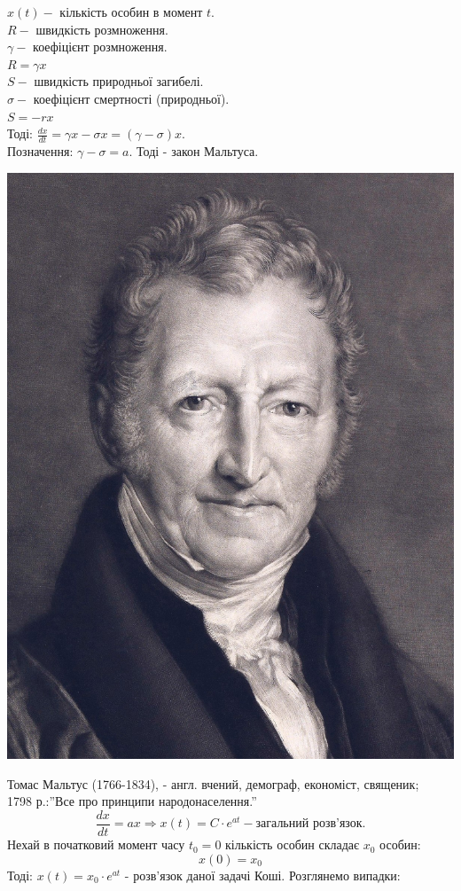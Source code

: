 $x(t) - $ кількість особин в момент $t$.\\
$R - $ швидкість розмноження. \\
$\gamma - $ коефіцієнт розмноження. \\
$ R = \gamma x $\\
$ S - $ швидкість природньої загибелі.\\
$\sigma - $ коефіцієнт смертності (природньої).\\
$S = - rx$\\
Тоді: $ \frac{dx}{dt} = \gamma x - \sigma x = (\gamma - \sigma)x $.\\
Позначення: $ \gamma - \sigma = a$. Тоді  - закон Мальтуса.
\begin{center} \includegraphics[scale=0.1]{assets/lectures_recent-44a47cac.png} \end{center}

Томас Мальтус (1766-1834), - англ. вчений, демограф, економіст, священик;\\
1798 р.:''Все про принципи народонаселення.''
$$
\frac{dx}{dt} = ax \Longrightarrow x(t) = C \cdot e^{at} - \text{загальний розв'язок.}
$$
Нехай в початковий момент часу $t_0 = 0$ кількість особин складає $x_0$ особин:
$$
x(0) = x_0
$$
Тоді: $x(t) = x_0 \cdot e^{at} $ - розв'язок даної задачі Коші. Розглянемо випадки:

